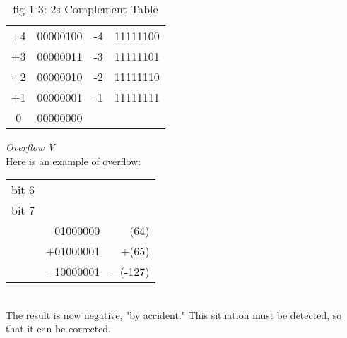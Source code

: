 \documentclass[12pt]{book}
\begin{document}
\begin{table}[H]
\begin{center}
\begin{tabular}{|c|c|c|c|}
+4   & 00000100                                                      & -4   & 11111100                                                      \\
+3   & 00000011                                                      & -3   & 11111101                                                      \\
+2   & 00000010                                                      & -2   & 11111110                                                      \\
+1   & 00000001                                                      & -1   & 11111111                                                      \\
0    & 00000000                                                      &      &                                                               \\ \hline
\end{tabular}
\caption{fig 1-3: 2s Complement Table}
\label{tab:fig 1-3}\end{center}
\end{table}
\noindent\textit{Overflow V}\\

Here is an example of overflow:
\begin{table}[H]\begin{center}
\begin{tabular}{lrr}
bit 6 & \multicolumn{1}{l}{} &         \\
bit 7 & \multicolumn{1}{l}{} &         \\
      & 01000000             & (64)    \\
      & +01000001            & +(65)   \\ \cline{2-3} 
      & =10000001            & =(-127)
\end{tabular}\end{center}
\end{table}
\\

The result is now negative, "by accident." This situation must be detected, so that it can be corrected.\\
\end{document}
